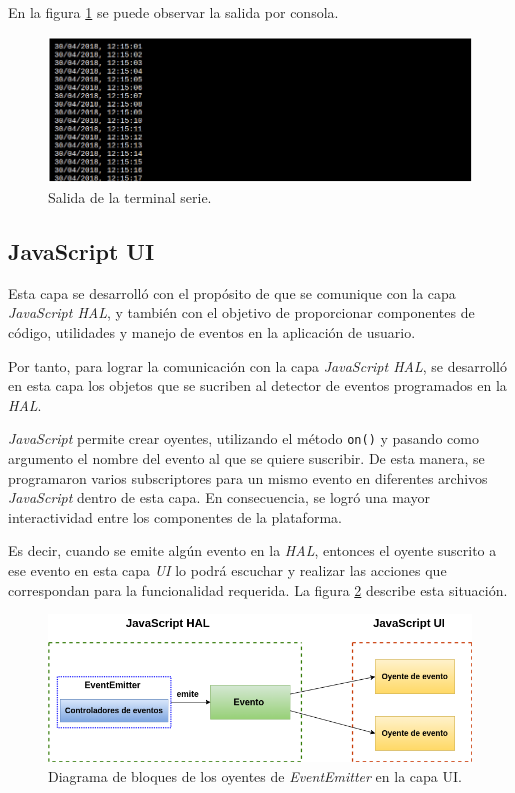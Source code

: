 En la figura \ref{fig:Terminal2} se puede observar la salida por consola.

\begin{figure}[ht]
	\centering
	\includegraphics[scale=.45]{./Figures/Terminal2.png}
	\caption{Salida de la terminal serie.}
	\label{fig:Terminal2}
\end{figure}
 

\subsection{JavaScript UI}

Esta capa se desarrolló con el propósito de que se comunique con la capa \textit{JavaScript HAL}, y también con el objetivo de proporcionar componentes de código, utilidades y manejo de eventos en la aplicación de usuario.

Por tanto, para lograr la comunicación con la capa \textit{JavaScript HAL}, se desarrolló en esta capa los objetos que se sucriben al detector de eventos programados en la \textit{HAL}.

\textit{JavaScript} permite crear oyentes, utilizando el método \texttt{on()} y pasando como argumento el nombre del evento al que se quiere suscribir. De esta manera, se  programaron varios subscriptores para un mismo evento en diferentes archivos \textit{JavaScript} dentro de esta capa. En consecuencia, se logró una mayor interactividad entre los componentes de la plataforma.

Es decir, cuando se emite algún evento en la \textit{HAL}, entonces el oyente suscrito a ese evento en esta capa \textit{UI} lo podrá escuchar y realizar las acciones que correspondan para la funcionalidad requerida. La figura \ref{fig:EventemitterNodeJSUI} describe esta situación.


\begin{figure}[ht]
	\centering
	\includegraphics[scale=.51]{./Figures/EventemitterNodeJSUI.png}
	\caption{Diagrama de bloques de los oyentes de \textit{EventEmitter} en la capa UI.}
	\label{fig:EventemitterNodeJSUI}
\end{figure}




